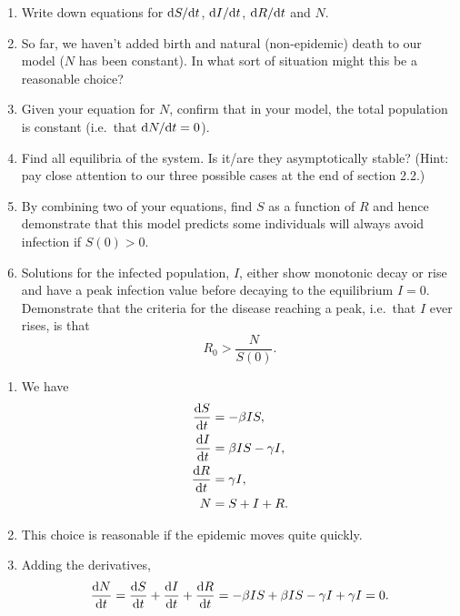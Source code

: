 \documentclass[a4paper,12pt]{article}
\begin{document}
\begin{enumerate}[label={\bf \arabic{*}.\;}, ref={\arabic{*}},itemsep=3ex, left=0ex]
{      \begin{enumerate}[label=(\alph*)]
        \item Write down equations for $\fd{S}{t}$, $\fd{I}{t}$, $\fd{R}{t}$ and $N$.
        \item So far, we haven't added birth and natural (non-epidemic) death to our model ($N$ has been constant). In what sort of situation might this be a reasonable choice?
        \item Given your equation for $N$, confirm that in your model, the total population is constant (i.e.\ that $\fd{N}{t} = 0$).
        \item Find all equilibria of the system. Is it/are they asymptotically stable? (Hint: pay close attention to our three possible cases at the end of section 2.2.)
        \item By combining two of your equations, find $S$ as a function of $R$ and hence demonstrate that this model predicts some individuals will always avoid infection if $S(0)>0$.
        \item Solutions for the infected population, $I$, either show monotonic decay or rise and have a peak infection value before decaying to the equilibrium $I=0$. Demonstrate that the criteria for the disease reaching a peak, i.e.\ that $I$ ever rises, is that
          \begin{equation}
            R_0>\frac{N}{S(0)}.
          \end{equation}
      \end{enumerate}
    }
    { %
      \begin{enumerate}[label=(\alph*)]
        \item We have
          \begin{align}
            \fd{S}{t} &= - \beta I S, \\
            \fd{I}{t} &= \beta I S - \gamma I,\\
            \fd{R}{t} &= \gamma I, \\
            N &= S + I + R.
          \end{align}

        \item This choice is reasonable if the epidemic moves quite quickly.

        \item Adding the derivatives,
          \begin{equation}
            \fd{N}{t} = \fd{S}{t} + \fd{I}{t} + \fd{R}{t} = -\beta I S + \beta I S - \gamma I + \gamma I = 0.
          \end{equation}


\end{enumerate}}
\end{enumerate}
\end{document}
